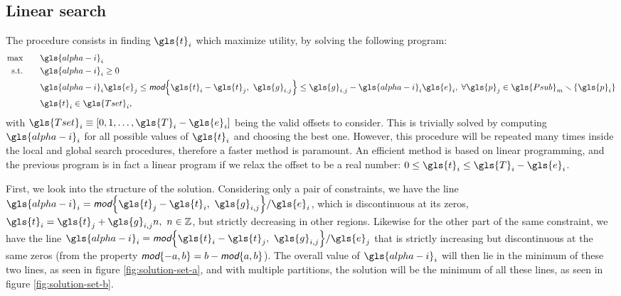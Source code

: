 \documentclass[main.tex]{subfiles}
\begin{document}
\subsection{Linear search}
\label{sec:line}

The  procedure consists in finding $\gls{t}_i$ which maximize utility, by solving the following program:
\begin{align}
    \begin{aligned}
        \text{max} \qquad &  \gls{alpha-i}_i\\
        \text{s.t.} \qquad & \gls{alpha-i}_i \geq 0 \\
        & \gls{alpha-i}_i\gls{e}_j \leq \mod\braces*{\gls{t}_i-\gls{t}_j,\ \gls{g}_{i,j}} \leq \gls{g}_{i,j}-\gls{alpha-i}_i\gls{e}_i,\; \forall \gls{p}_j\in\gls{Psub}_m\smallsetminus\braces*{\gls{p}_i} \\
        & \gls{t}_i\in\gls{Tset}_i,
    \end{aligned}
\end{align}
with $\gls{Tset}_i\equiv\left[0,1,\ldots,\gls{T}_i-\gls{e}_i\right]$ being the valid offsets to consider.
This is trivially solved by computing $\gls{alpha-i}_i$ for all possible values of $\gls{t}_i$ and choosing the best one.
However, this procedure will be repeated many times inside the local and global search procedures, therefore a faster method is paramount.
An efficient method is based on linear programming, and the previous program is in fact a linear program if we relax the offset to be a real number: $0\leq\gls{t}_i\leq\gls{T}_i-\gls{e}_i$.

First, we look into the structure of the solution. 
Considering only a pair of constraints, we have the line $\gls{alpha-i}_i=\mod\braces*{\gls{t}_j-\gls{t}_i,\ \gls{g}_{i,j}}/\gls{e}_i$, which is discontinuous at its zeros, $\gls{t}_i=\gls{t}_j+\gls{g}_{i,j}n,\ n\in\mathbb{Z}$, but strictly decreasing in other regions. 
Likewise for the other part of the same constraint, we have the line $\gls{alpha-i}_i=\mod\braces*{\gls{t}_i-\gls{t}_j,\ \gls{g}_{i,j}}/\gls{e}_j$ that is strictly increasing but discontinuous at the same zeros (from the property $\mod\braces*{-a,b}=b-\mod\braces{a,b}$).
The overall value of $\gls{alpha-i}_i$ will then lie in the minimum of these two lines, as seen in figure \ref{fig:solution-set-a}, and with multiple partitions, the solution will be the minimum of all these lines, as seen in figure \ref{fig:solution-set-b}.
\end{document}

